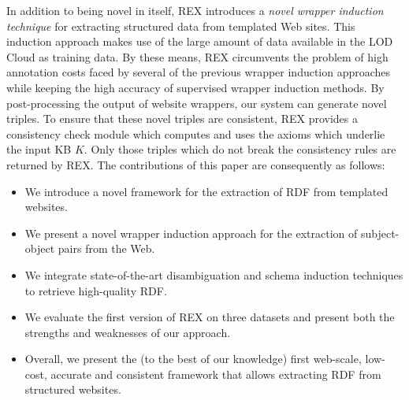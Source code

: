 In addition to being novel in itself, REX introduces a \emph{novel wrapper induction technique} for extracting structured data from templated Web sites. 
This induction approach makes use of the large amount of data available in the \ac{LOD} Cloud as training data. 
By these means, REX circumvents the problem of high annotation costs faced by several of the previous wrapper induction approaches~\cite{flesca2004web,Hogue:2005:TAU:1060745.1060762} while keeping the high accuracy of supervised wrapper induction methods. 
By post-processing the output of website wrappers, our system can generate novel triples. 
To ensure that these novel triples are consistent, REX provides a consistency check module which computes and uses the axioms which underlie the input  \ac{KB} $K$. 
Only those triples which do not break the consistency rules are returned by REX. 
The contributions of this paper are consequently as follows:
\begin{itemize}
\item We introduce a novel framework for the extraction of \ac{RDF} from templated websites.
\item We present a novel wrapper induction approach for the extraction of subject-object pairs from the Web.
\item We integrate state-of-the-art disambiguation and schema induction techniques to retrieve high-quality \ac{RDF}. 
\item We evaluate the first version of REX on three datasets and present both the strengths and weaknesses of our approach.
\item Overall, we present the (to the best of our knowledge) first web-scale, low-cost, accurate and consistent framework that allows extracting \ac{RDF} from structured websites.
\end{itemize}

